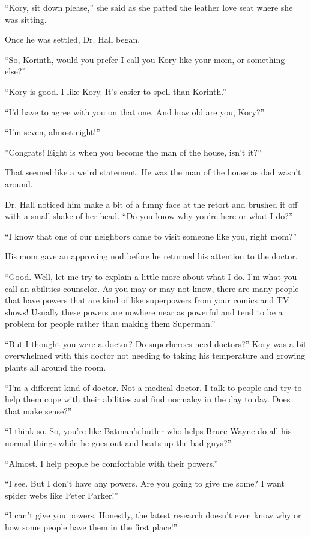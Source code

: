 ``Kory, sit down please,'' she said as she patted the leather love seat where she was sitting.

Once he was settled, Dr. Hall began.

``So, Korinth, would you prefer I call you Kory like your mom, or something else?''

``Kory is good. I like Kory. It's easier to spell than Korinth.''

``I'd have to agree with you on that one. And how old are you, Kory?''

``I'm seven, almost eight!''

''Congrats! Eight is when you become the man of the house, isn't it?''

That seemed like a weird statement. He was the man of the house as dad wasn't around.

Dr. Hall noticed him make a bit of a funny face at the retort and brushed it off with a small shake of her head. ``Do you know why you're here or what I do?''

``I know that one of our neighbors came to visit someone like you, right mom?''

His mom gave an approving nod before he returned his attention to the doctor.

``Good. Well, let me try to explain a little more about what I do. I'm what you call an abilities counselor. As you may or may not know, there are many people that have powers that are kind of like superpowers from your comics and TV shows! Usually these powers are nowhere near as powerful and tend to be a problem for people rather than making them Superman.''

``But I thought you were a doctor? Do superheroes need doctors?'' Kory was a bit overwhelmed with this doctor not needing to taking his temperature and growing plants all around the room.

``I'm a different kind of doctor. Not a medical doctor. I talk to people and try to help them cope with their abilities and find normalcy in the day to day. Does that make sense?''

``I think so. So, you're like Batman's butler who helps Bruce Wayne do all his normal things while he goes out and beats up the bad guys?''

``Almost. I help people be comfortable with their powers.''

``I see. But I don't have any powers. Are you going to give me some? I want spider webs like Peter Parker!''

``I can't give you powers. Honestly, the latest research doesn't even know why or how some people have them in the first place!''

